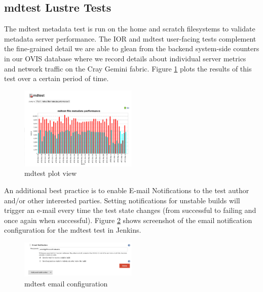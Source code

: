 \documentclass[AMA]{WileyNJD-v1}
\begin{document}
\subsection{mdtest Lustre Tests}
The mdtest metadata test is run on the home and scratch filesystems to validate metadata server performance.  The IOR and mdtest user-facing tests complement the fine-grained detail we are able to glean from the backend system-side counters in our OVIS \cite{OVIS} database where we record details about individual server metrics and network traffic on the Cray Gemini fabric. Figure \ref{fig:mdtest-plot} plots the results of this test over a certain period of time. 
\begin{figure}[H]
\centering
\includegraphics[width=0.5\textwidth]{mdtest-plot}
\caption{mdtest plot view }
\label{fig:mdtest-plot}
\end{figure}

An additional best practice is to enable E-mail Notifications to the test author and/or other interested parties. Setting notifications for unstable builds will trigger an e-mail every time the test state changes (from successful to failing and once again when successful). Figure \ref{fig:mdtest-config-email} shows screenshot of the email notification configuration for the mdtest test in Jenkins.
\begin{figure}[H]
\centering
\includegraphics[width=0.5\textwidth]{mdtest-config-email}
\caption{ mdtest email configuration }
\label{fig:mdtest-config-email}
\end{figure}
\end{document}
